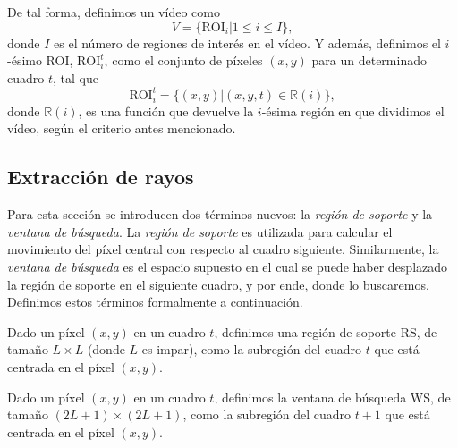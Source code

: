	De tal forma, definimos un vídeo como 
	\begin{equation}\label{algoritmo:eq:video}		
		V = \{\text{ROI}_i | 1 \leq i \le I\}, 
	\end{equation}
	donde $I$ es el número de regiones de interés en el vídeo. Y además, definimos el $i$-ésimo ROI, $\text{ROI}_i^t$, como el conjunto de píxeles $(x,y)$ para un determinado cuadro $t$, tal que
	\begin{equation}\label{algoritmo:eq:roi}
		\text{ROI}_{i}^{t} = \{(x,y) | (x,y,t) \in \mathds{R}(i)\},
	\end{equation}
	donde $\mathds{R}(i)$, es una función que devuelve la $i$-ésima región en que dividimos el vídeo, según el criterio antes mencionado.

	\subsection{Extracción de rayos}
	\label{algoritmo:ext_rayos}
	
	Para esta sección se introducen dos términos nuevos: la \textit{región de soporte} y la \textit{ventana de búsqueda}. La \textit{región de soporte} es utilizada para calcular el movimiento del píxel central con respecto al cuadro siguiente. Similarmente, la \textit{ventana de búsqueda} es el espacio supuesto en el cual se puede haber desplazado la región de soporte en el siguiente cuadro, y por ende, donde lo buscaremos. Definimos estos términos formalmente a continuación.
	
	\begin{definition}	
  Dado un píxel $(x,y)$ en un cuadro $t$, definimos una región de soporte RS, de tamaño $L \times L$ (donde $L$ es impar), como la subregión del cuadro $t$ que está centrada en el píxel $(x,y)$.
	\end{definition}

	\begin{definition}
	Dado un píxel $(x,y)$ en un cuadro $t$, definimos la ventana de búsqueda WS, de  tamaño $(2L+1) \times (2L+1)$, como la subregión del cuadro $t+1$ que está centrada en el píxel $(x,y)$.
	\end{definition}
		
